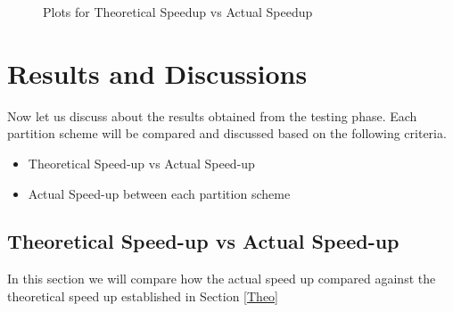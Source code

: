 \documentclass[conference]{IEEEtran}
\begin{document}
	\begin{figure}[!t]
		\centering
		\caption{Plots for Theoretical Speedup vs Actual Speedup}
	\end{figure}
	\section{Results and Discussions}
	
	
	Now let us discuss about the results obtained from the testing phase. Each partition scheme will be compared and discussed based on the following criteria. 
	
	\begin{itemize}
		\item Theoretical Speed-up vs Actual Speed-up
		\item Actual Speed-up between each partition scheme
	\end{itemize}

	\subsection{Theoretical Speed-up vs Actual Speed-up}
	
	In this section we will compare how the actual speed up compared against the theoretical speed up established in Section \ref{Theo}
	
\end{document}
